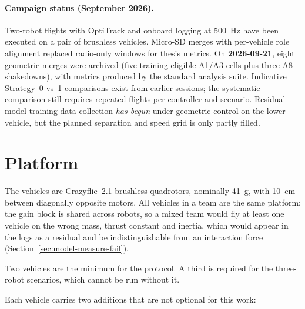 \paragraph{Campaign status (September 2026).}
Two-robot flights with OptiTrack and onboard logging at \SI{500}{\hertz} have been executed on
a pair of brushless vehicles. Micro-SD merges with per-vehicle role alignment replaced radio-only
windows for thesis metrics. On \textbf{2026-09-21}, eight geometric merges were archived (five
training-eligible A1/A3 cells plus three A8 shakedowns), with metrics produced by the standard
analysis suite. Indicative Strategy~0 vs~1 comparisons exist from earlier sessions; the systematic
comparison still requires repeated flights per controller and scenario. Residual-model training
data collection \emph{has begun} under geometric control on the lower vehicle, but the planned
separation and speed grid is only partly filled.

\section{Platform}
\label{sec:setup-platform}

The vehicles are Crazyflie~2.1 brushless quadrotors, nominally \SI{41}{\gram}, with
\SI{10}{\centi\metre} between diagonally opposite motors. All vehicles in a team are the same platform: the gain block
is shared across robots, so a mixed team would fly at least one vehicle on the wrong mass, thrust
constant and inertia, which would appear in the logs as a residual and be indistinguishable from
an interaction force (Section~\ref{sec:model-measure-fail}).

Two vehicles are the minimum for the protocol. A third is required for the three-robot scenarios,
which cannot be run without it.

Each vehicle carries two additions that are not optional for this work:

